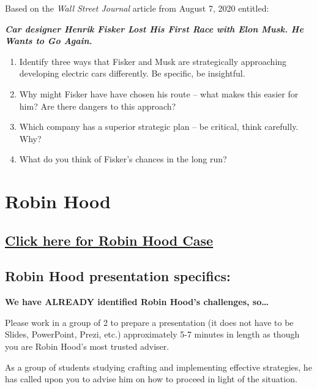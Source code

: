 \documentclass[
]{book}
\providecommand{\tightlist}{%
  \setlength{\itemsep}{0pt}\setlength{\parskip}{0pt}}
\begin{document}
Based on the \emph{Wall Street Journal} article from August 7, 2020 entitled:

\textbf{\emph{Car designer Henrik Fisker Lost His First Race with Elon Musk. He Wants to Go Again.}}

\begin{enumerate}
\def\labelenumi{\arabic{enumi}.}
\tightlist
\item
  Identify three ways that Fisker and Musk are strategically approaching developing electric cars differently. Be specific, be insightful.
\item
  Why might Fisker have have chosen his route -- what makes this easier for him? Are there dangers to this approach?
\item
  Which company has a superior strategic plan -- be critical, think carefully. Why?
\item
  What do you think of Fisker's chances in the long run?
\end{enumerate}

\hypertarget{robin-hood}{%
\chapter{Robin Hood}\label{robin-hood}}

\hypertarget{click-here-for-robin-hood-case}{%
\section{\texorpdfstring{\href{https://nanopdf.com/download/robin-hood-case-salem-state-university_pdf}{Click here for Robin Hood Case}}{Click here for Robin Hood Case}}\label{click-here-for-robin-hood-case}}

\hypertarget{robin-hood-presentation-specifics}{%
\section{Robin Hood presentation specifics:}\label{robin-hood-presentation-specifics}}

\textbf{We have ALREADY identified Robin Hood's challenges, so\ldots{}}

Please work in a group of 2 to prepare a presentation (it does not have to be Slides, PowerPoint, Prezi, etc.) approximately 5-7 minutes in length as though you are Robin Hood's most trusted adviser.

As a group of students studying crafting and implementing effective strategies, he has called upon you to advise him on how to proceed in light of the situation.
\end{document}
